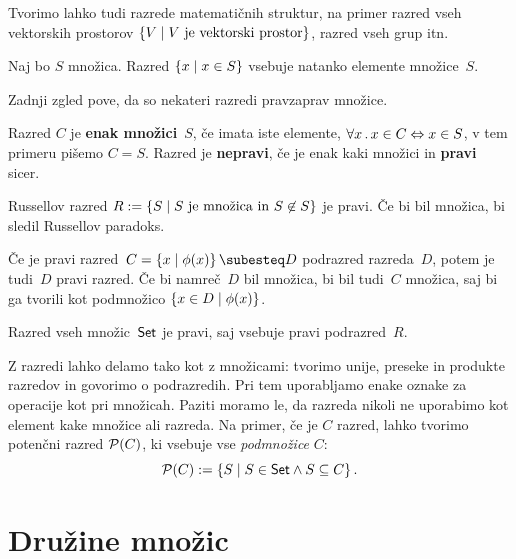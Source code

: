 \begin{zgled}
  Tvorimo lahko tudi razrede matematičnih struktur, na primer razred vseh vektorskih prostorov $\left\{V \; \middle| \; \text{$V$ je vektorski prostor}\right\}$, razred vseh grup itn.
\end{zgled}

\begin{zgled}
  Naj bo $S$ množica. Razred $\left\{x \; \middle| \; x \in S\right\}$ vsebuje natanko elemente množice~$S$.
\end{zgled}

Zadnji zgled pove, da so nekateri razredi pravzaprav množice.

\begin{definicija}
  Razred $C$ je \textbf{enak množici}~$S$, če imata iste elemente, $\forall x \,.\, x \in C \Leftrightarrow x \in S$, v tem
  primeru pišemo $C = S$. Razred je \textbf{nepravi}, če je enak kaki množici in \textbf{pravi} sicer.
\end{definicija}

\begin{zgled}
  Russellov razred
  $R \mathrel{{:}{=}} \left\{ S \; \middle| \; \text{$S$ je množica in $S \not\in S$} \right\}$
  je pravi. Če bi bil množica, bi sledil Russellov paradoks.
\end{zgled}

\begin{zgled}
  Če je pravi razred~$C = \set{ x \such \phi(x)} \subesteq D$ podrazred razreda~$D$, potem je tudi~$D$ pravi razred. Če bi namreč~$D$ bil množica, bi bil tudi~$C$ množica, saj bi ga tvorili kot podmnožico $\left\{x \in D \; \middle| \; \phi(x)\right\}$.
\end{zgled}

\begin{zgled}
  Razred vseh množic~$\mathsf{Set}$ je pravi, saj vsebuje pravi podrazred~$R$.
\end{zgled}

Z razredi lahko delamo tako kot z množicami: tvorimo unije, preseke in produkte
razredov in govorimo o podrazredih. Pri tem uporabljamo enake oznake za
operacije kot pri množicah. Paziti moramo le, da razreda nikoli ne uporabimo kot
element kake množice ali razreda. Na primer, če je $C$ razred, lahko tvorimo
potenčni razred $\mathcal{P}(C)$, ki vsebuje vse \emph{podmnožice} $C$:
%
\begin{equation*}
  \mathcal{P}(C) \mathrel{{:}{=}} \left\{ S \; \middle| \; S \in \mathsf{Set} \land S \subseteq C \right\}.
\end{equation*}

\section{Družine množic}
\label{sec:druzine-mnozic}


